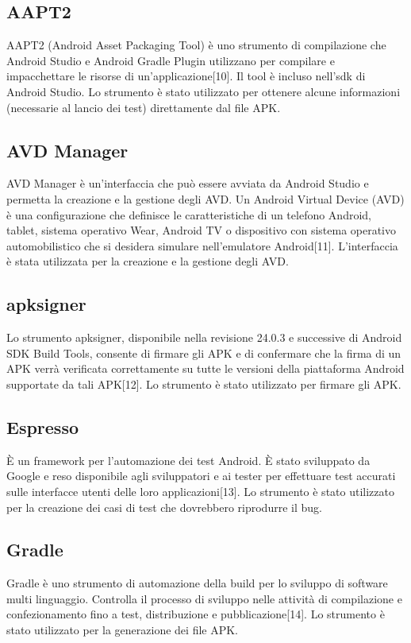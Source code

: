 \subsection*{AAPT2}
\label{cap:aapt2}
AAPT2 (Android Asset Packaging Tool) è uno strumento di compilazione che Android Studio e Android Gradle Plugin utilizzano per compilare e impacchettare le risorse di un'applicazione[10]. Il tool è incluso nell'sdk di Android Studio. Lo strumento è stato utilizzato per ottenere alcune informazioni (necessarie al lancio dei test) direttamente dal file APK.


\subsection*{AVD Manager}
AVD Manager è un'interfaccia che può essere avviata da Android Studio e permetta la creazione e la gestione degli AVD. Un Android Virtual Device (AVD) è una configurazione che definisce le caratteristiche di un telefono Android, tablet, sistema operativo Wear, Android TV o dispositivo con sistema operativo automobilistico che si desidera simulare nell'emulatore Android[11]. L'interfaccia è stata utilizzata per la creazione e la gestione degli AVD.

\subsection*{apksigner}
Lo strumento apksigner, disponibile nella revisione 24.0.3 e successive di Android SDK Build Tools, consente di firmare gli APK e di confermare che la firma di un APK verrà verificata correttamente su tutte le versioni della piattaforma Android supportate da tali APK[12]. Lo strumento è stato utilizzato per firmare gli APK.

\subsection*{Espresso}
È un framework per l’automazione dei test Android. È stato sviluppato da Google e reso disponibile agli sviluppatori e ai tester per effettuare test accurati sulle interfacce utenti delle loro applicazioni[13]. Lo strumento è stato utilizzato per la creazione dei casi di test che dovrebbero riprodurre il bug.

\subsection*{Gradle}
Gradle è uno strumento di automazione della build per lo sviluppo di software multi linguaggio. Controlla il processo di sviluppo nelle attività di compilazione e confezionamento fino a test, distribuzione e pubblicazione[14]. Lo strumento è stato utilizzato per la generazione dei file APK.

